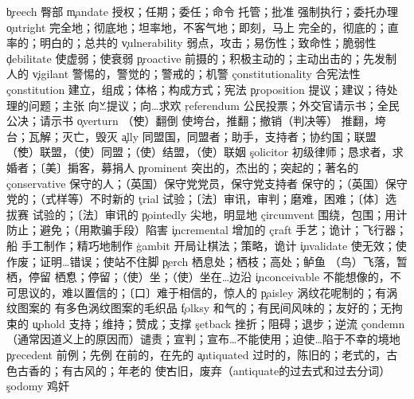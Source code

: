 \begin{multicols}{2}
\c{breech}  \n 臀部
\c{mandate}  \n 授权；任期；委任；命令 \vt 托管；批准 \vi 强制执行；委托办理
\c{outright}  \ad 完全地；彻底地；坦率地，不客气地；即刻，马上 \a 完全的，彻底的；直率的；明白的；总共的
\c{vulnerability}  \n 弱点，攻击；易伤性；致命性；脆弱性
\c{debilitate}  \vt 使虚弱；使衰弱
\c{proactive}  \a 前摄的；积极主动的；主动出击的；先发制人的
\c{vigilant}  \a 警惕的，警觉的；警戒的；机警
\c{constitutionality}  \n 合宪法性
\c{constitution}  \n 建立，组成；体格；构成方式；宪法
\c{proposition}  \n 提议；建议；待处理的问题；主张 \v 向…提议；向…求欢
\c{referendum}  \n 公民投票；外交官请示书；全民公决；请示书
\c{overturn}  \v （使）翻倒 \vt 使垮台，推翻；撤销（判决等） \n 推翻，垮台；瓦解；灭亡，毁灭
\c{ally}  \n 同盟国，同盟者；助手，支持者；协约国；联盟 \v （使）联盟，（使）同盟；（使）结盟，（使）联姻
\c{solicitor}  \n 初级律师；恳求者，求婚者；〔美〕掮客，募捐人
\c{prominent}  \a 突出的，杰出的；突起的；著名的
\c{conservative}  \n 保守的人；（英国）保守党党员，保守党支持者 \a 保守的；（英国）保守党的；（式样等）不时新的
\c{trial}  \n 试验；〔法〕审讯，审判；磨难，困难；〔体〕选拔赛 \a 试验的；〔法〕审讯的
\c{pointedly}  \ad 尖地，明显地
\c{circumvent}  \vt 围绕，包围；用计防止；避免；（用欺骗手段）陷害
\c{incremental}  \a 增加的
\c{craft}  \n 手艺；诡计；飞行器；船 \vt 手工制作；精巧地制作
\c{gambit}  \n 开局让棋法；策略，诡计
\c{invalidate}  \vt 使无效；使作废；证明…错误；使站不住脚
\c{perch}  \n 栖息处；栖枝；高处；鲈鱼 \vi （鸟）飞落，暂栖，停留 \v 栖息；停留；（使）坐；（使）坐在…边沿
\c{inconceivable}  \a 不能想像的，不可思议的，难以置信的；〔口〕难于相信的，惊人的
\c{paisley}  \a 涡纹花呢制的；有涡纹图案的 \n 有多色涡纹图案的毛织品
\c{folksy}  \a 和气的；有民间风味的；友好的；无拘束的
\c{uphold}  \vt 支持；维持；赞成；支撑
\c{setback}  \n 挫折；阻碍；退步；逆流
\c{condemn}  \vt （通常因道义上的原因而）谴责；宣判；宣布…不能使用；迫使…陷于不幸的境地
\c{precedent}  \n 前例；先例 \a 在前的，在先的
\c{antiquated}  \a 过时的，陈旧的；老式的，古色古香的；有古风的；年老的 \v 使古旧，废弃（antiquate的过去式和过去分词）
\c{sodomy}  \n 鸡奸

\end{multicols}
